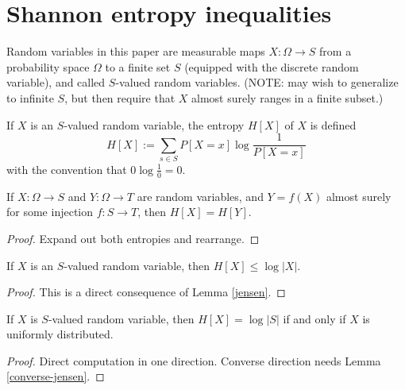 \chapter{Shannon entropy inequalities}

Random variables in this paper are measurable maps $X : \Omega \to S$ from a probability space $\Omega$ to a finite set $S$ (equipped with the discrete random variable), and called $S$-valued random variables.
(NOTE: may wish to generalize to infinite $S$, but then require that $X$ almost surely ranges in a finite subset.)

\begin{definition}[Entropy]
  \label{entropy-def}
  \leanok
  If $X$ is an $S$-valued random variable, the entropy $H[X]$ of $X$ is defined
  $$ H[X] := \sum_{s \in S} P[X=x] \log \frac{1}{P[X=x]}$$
  with the convention that $0 \log \frac{1}{0} = 0$.
\end{definition}

\begin{lemma}\label{relabeled-entropy}   If $X: \Omega \to S$ and $Y: \Omega \to T$ are random variables, and $Y = f(X)$ almost surely for some injection $f: S \to T$, then $H[X] = H[Y]$.
\end{lemma}

\begin{proof} Expand out both entropies and rearrange.
\end{proof}

\begin{lemma}\label{jensen-bound}
\leanok
If $X$ is an $S$-valued random variable, then $H[X] \leq \log |X|$.
\end{lemma}

\begin{proof}\leanok
  This is a direct consequence of Lemma \ref{jensen}.
\end{proof}

\begin{lemma}\label{uniform-entropy}
If $X$ is $S$-valued random variable, then $H[X] = \log |S|$ if and only if $X$ is uniformly distributed.
\end{lemma}

\begin{proof}  Direct computation in one direction.  Converse direction needs Lemma \ref{converse-jensen}.
\end{proof}

